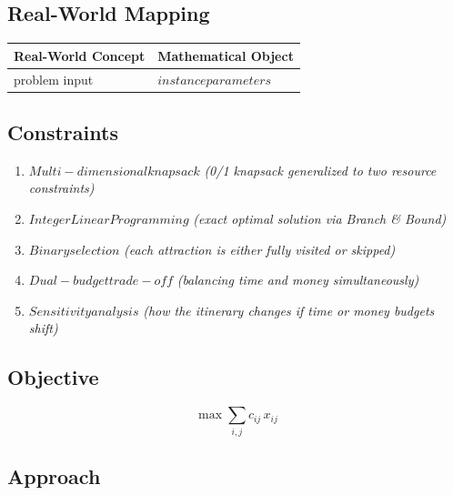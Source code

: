 \documentclass[11pt, a4paper]{article}
\begin{document}
\subsection{Real-World Mapping}

\begin{longtable}{ll}
\toprule
\textbf{Real-World Concept} & \textbf{Mathematical Object} \\
\midrule
\endhead
problem input & $instance parameters$ \\
\bottomrule
\end{longtable}

\subsection{Constraints}

\begin{enumerate}
  \item $Multi-dimensional knapsack$
  \hfill \textit{(0/1 knapsack generalized to two resource constraints)}
  \item $Integer Linear Programming$
  \hfill \textit{(exact optimal solution via Branch \& Bound)}
  \item $Binary selection$
  \hfill \textit{(each attraction is either fully visited or skipped)}
  \item $Dual-budget trade-off$
  \hfill \textit{(balancing time and money simultaneously)}
  \item $Sensitivity analysis$
  \hfill \textit{(how the itinerary changes if time or money budgets shift)}
\end{enumerate}

\subsection{Objective}

\begin{equation}
\max \sum_{i,j} c_{ij} \, x_{ij}
\end{equation}

\subsection{Approach}
\end{document}
